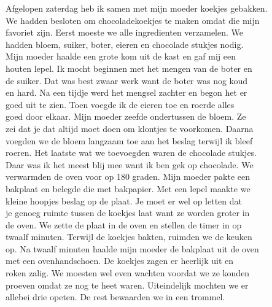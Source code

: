 \begin{opgave}

\begin{tekstmetfouten}
Afgelopen zaterdag heb ik samen met mijn moeder koekjes gebakken.\\
We hadden besloten om chocoladekoekjes te maken omdat die mijn\\
favoriet zijn. Eerst moeste we alle ingredienten verzamelen. We\\
hadden bloem, suiker, boter, eieren en chocolade stukjes nodig.\\
Mijn moeder haalde een grote kom uit de kast en gaf mij een\\
houten lepel. Ik mocht beginnen met het mengen van de boter en\\
de suiker. Dat was best zwaar werk want de boter was nog koud\\
en hard. Na een tijdje werd het mengsel zachter en begon het er\\
goed uit te zien. Toen voegde ik de eieren toe en roerde alles\\
goed door elkaar. Mijn moeder zeefde ondertussen de bloem. Ze\\
zei dat je dat altijd moet doen om klontjes te voorkomen. Daarna\\
voegden we de bloem langzaam toe aan het beslag terwijl ik bleef\\
roeren. Het laatste wat we toevoegden waren de chocolade stukjes.\\
Daar was ik het meest blij mee want ik ben gek op chocolade. We\\
verwarmden de oven voor op 180 graden. Mijn moeder pakte een\\
bakplaat en belegde die met bakpapier. Met een lepel maakte we\\
kleine hoopjes beslag op de plaat. Je moet er wel op letten dat\\
je genoeg ruimte tussen de koekjes laat want ze worden groter in\\
de oven. We zette de plaat in de oven en stellen de timer in op\\
twaalf minuten. Terwijl de koekjes bakten, ruimden we de keuken\\
op. Na twaalf minuten haalde mijn moeder de bakplaat uit de oven\\
met een ovenhandschoen. De koekjes zagen er heerlijk uit en\\
roken zalig. We moesten wel even wachten voordat we ze konden\\
proeven omdat ze nog te heet waren. Uiteindelijk mochten we er\\
allebei drie opeten. De rest bewaarden we in een trommel.
\end{tekstmetfouten}


\end{opgave}
